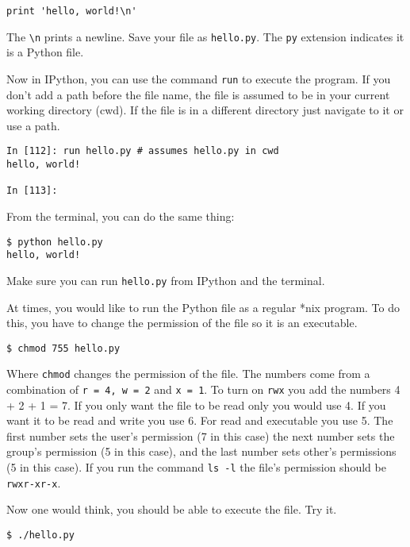 \documentclass[12pt]{article}
\begin{document}
\begin{lstlisting}[style=c]
print 'hello, world!\n'
\end{lstlisting}

The \texttt{\textbackslash n} prints a newline. Save your file as \texttt{hello.py}. The \texttt{py} extension indicates it is a Python file.


Now in IPython, you can use the command \texttt{run} to execute the program. If you don't add a path before the file name, the file is assumed to be in your current working directory (cwd). If the file is in a different directory just navigate to it or use a path.

\begin{lstlisting}[style=bash]
In [112]: run hello.py # assumes hello.py in cwd 
hello, world!

In [113]:
\end{lstlisting}

From the terminal, you can do the same thing:

\begin{lstlisting}[style=bash]
$ python hello.py
hello, world!
\end{lstlisting}

Make sure you can run \texttt{hello.py} from IPython and the terminal.

At times, you would like to run the Python file as a regular *nix program. To do this, you have to change the permission of the file so it is an executable. 


\begin{lstlisting}[style=bash]
$ chmod 755 hello.py
\end{lstlisting}

Where \texttt{chmod} changes the permission of the file. The numbers come from a combination of \texttt{r = 4, w = 2} and \texttt{x = 1}. To turn on \texttt{rwx} you add the numbers 4 + 2 + 1 = 7. If you only want the file to be read only you would use 4. If you want it to be read and write you use 6. For read and executable you use 5. The first number sets the user's permission (7 in this case) the next number sets the group's permission (5 in this case), and the last number sets other's permissions (5 in this case). If you run the command \texttt{ls -l} the file's permission should be \texttt{rwxr-xr-x}.

Now one would think, you should be able to execute the file. Try it.

\begin{lstlisting}[style=bash]
$ ./hello.py
\end{lstlisting}
\end{document}
